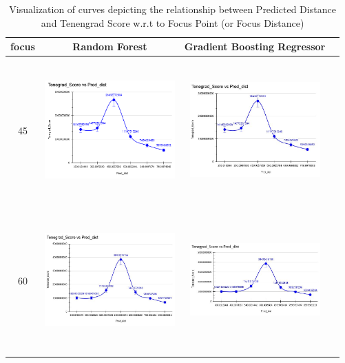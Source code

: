 \documentclass[sn-mathphys]{sn-jnl}%
\theoremstyle{thmstyleone}%
\theoremstyle{thmstyletwo}%
\theoremstyle{thmstylethree}%
\begin{document}
\begin{table}[!htbp]
\caption{Visualization of  curves depicting the relationship between Predicted Distance and Tenengrad Score w.r.t to Focus Point (or Focus Distance)} 
\label{tab:modelinv1}
\centering 
\begin{tabular}{ c c c c }\hline  
focus&Random Forest & Gradient Boosting Regressor \\
\hline
\hline
45& \includegraphics[width=5cm,height=5.5cm]{rf45.JPG} & \includegraphics[width=5cm,height=5.5cm]{gbr45.JPG} \\
\hline
60 & \includegraphics[width=5cm,height=5.5cm]{rf60.JPG} & \includegraphics[width=5cm,height=5.5cm]{gbr60.JPG} \\

\end{tabular}
\end{table}
\end{document}
